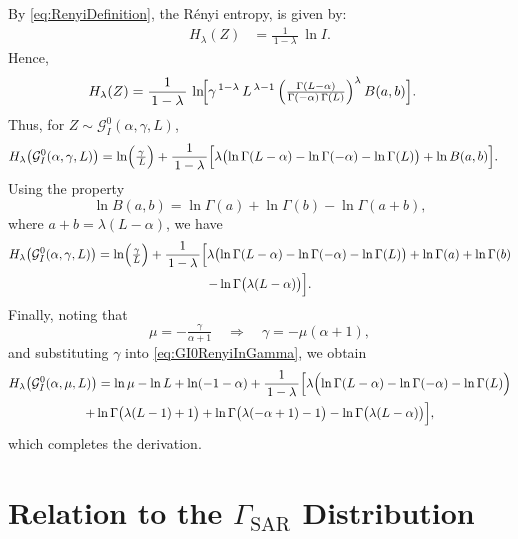 \documentclass[
  letterpaper,
  11pt,
  english,
  doublespacing,
  headsepline,
  consistentlayout,
  oneside,
  openany]{MastersDoctoralThesis}
\begin{document}
\medskip

\noindent By \eqref{eq:RenyiDefinition}, the Rényi entropy, is given by:
\begin{align*}
H_\lambda(Z)
&= \frac{1}{\,1 - \lambda\,} \,\ln I.
\end{align*} Hence, \begin{align*}
H_\lambda(Z) 
&= \frac{1}{\,1 - \lambda\,}
  \,\ln\!\Bigl[
    \gamma^{\,1 - \lambda}\,
    L^{\,\lambda - 1}\,
    \Bigl(\tfrac{\Gamma(L - \alpha)}{\Gamma(-\alpha)\,\Gamma(L)}\Bigr)^\lambda
    \,B(a,b)
  \Bigr].
\end{align*} Thus, for \(Z \sim \mathcal{G}^0_I(\alpha, \gamma, L)\),
\begin{align*}
H_\lambda\bigl(\mathcal{G}^0_I(\alpha, \gamma, L)\bigr)
&= \ln\Bigl(\tfrac{\gamma}{\,L}\Bigr)
  + \frac{1}{\,1 - \lambda\,}
    \Bigl[
      \lambda\bigl(\ln \Gamma(L - \alpha) 
            - \ln \Gamma(-\alpha) 
            - \ln \Gamma(L)\bigr)
      + \ln B(a,b)
    \Bigr].
\end{align*} Using the property \[
\ln B(a,b) 
= \ln \Gamma(a) + \ln \Gamma(b) - \ln \Gamma(a + b),
\] where \(a + b = \lambda(L - \alpha)\), we have \begin{multline}
H_\lambda\bigl(\mathcal{G}^0_I( \alpha,\gamma, L)\bigr)
= \ln\Bigl(\tfrac{\gamma}{L}\Bigr)
 + \frac{1}{\,1 - \lambda\,}
   \Bigl[
     \lambda\bigl(\ln \Gamma(L - \alpha) 
            - \ln \Gamma(-\alpha) 
            - \ln \Gamma(L)\bigr)
     + \ln \Gamma(a)
     + \ln \Gamma(b) \\
     - \ln \Gamma\bigl(\lambda(L - \alpha)\bigr)
   \Bigr].
\label{eq:GI0RenyiInGamma}
\end{multline} Finally, noting that \[
\mu = -\tfrac{\gamma}{\alpha + 1}
\quad\Longrightarrow\quad
\gamma = -\mu(\alpha + 1),
\] and substituting \(\gamma\) into \eqref{eq:GI0RenyiInGamma}, we
obtain \begin{multline}
H_\lambda\bigl(\mathcal{G}^0_I( \alpha,\mu, L)\bigr)
= \ln \mu  -  \ln L + \ln(- 1-\alpha)
+ \frac{1}{\,1 - \lambda\,}
  \Bigl[
    \lambda\Bigl(\ln \Gamma(L - \alpha) 
        - \ln \Gamma(-\alpha) 
        - \ln \Gamma(L)\Bigr)\\
    + \ln \Gamma\bigl(\lambda(L - 1) + 1\bigr)
    + \ln \Gamma\bigl(\lambda(-\alpha + 1) - 1\bigr)
    - \ln \Gamma\bigl(\lambda(L - \alpha)\bigr)
  \Bigr],
\label{eq:RenyiGI0Final}
\end{multline} which completes the derivation.

\section{\texorpdfstring{Relation to the
\texorpdfstring{$\Gamma_{\mathrm{SAR}}$}{Gamma SAR}
Distribution}{Relation to the  Distribution}}\label{relation-to-the-distribution}
\end{document}

